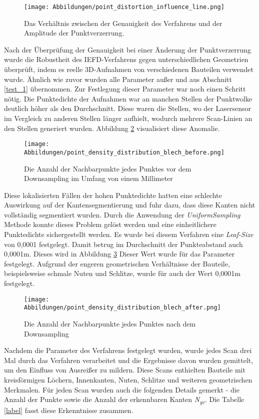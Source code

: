 \begin{figure}[h]
	\texttt{[image: Abbildungen/point\_distortion\_influence\_line.png]}
	\centering
	\caption{Das Verhältnis zwischen der Genauigkeit des Verfahrens und der Amplitude der Punktverzerrung.}
	\label{fig: point_distortion_comparision}
\end{figure}

Nach der Überprüfung der Genauigkeit bei einer Änderung der Punktverzerrung wurde die Robustheit des IEFD-Verfahrens gegen unterschiedlichen Geometrien überprüft, indem es reelle 3D-Aufnahmen von verschiedenen Bauteilen verwendet wurde. Ähnlich wie zuvor wurden alle Parameter außer \distthresha und \distthreshb aus Abschnitt \ref{test_1} übernommen. Zur Festlegung dieser Parameter war noch einen Schritt nötig. Die Punktedichte der Aufnahmen war an manchen Stellen der Punktwolke deutlich höher als den Durchschnitt. Diese waren die Stellen, wo der Lasersensor im Vergleich zu anderen Stellen länger aufhielt, wodurch mehrere Scan-Linien an den Stellen generiert wurden. Abbildung \ref{fig: point_density_before} visualisiert diese Anomalie. 

\begin{figure}[t]
\texttt{[image: Abbildungen/point\_density\_distribution\_blech\_before.png]}
\centering
\caption{Die Anzahl der Nachbarpunkte jedes Punktes vor dem Downsampling im Umfang von einem Millimeter}
\label{fig: point_density_before}
\end{figure}

Diese lokalisierten Fällen der hohen Punktedichte hatten eine schlechte Auswirkung auf der Kantensegmentierung und fuhr dazu, dass diese Kanten nicht vollständig segmentiert wurden. Durch die Anwendung der \textit{UniformSampling} Methode konnte dieses Problem gelöst werden und eine einheitlichere Punktedichte sichergestellt werden. Es wurde bei diesem Verfahren eine \textit{Leaf-Size} von 0,0001 festgelegt. Damit betrug im Durchschnitt der Punkteabstand auch 0,0001m. Dieses wird in Abbildung \ref{fig: point_density_after} Dieser Wert wurde für das Parameter \distthresha festgelegt. Aufgrund der engeren geometrischen Verhältnisse der Bauteile, beispielsweise schmale Nuten und Schlitze, wurde für \distthreshb auch der Wert 0,0001m festgelegt.

\begin{figure}[t]
	\texttt{[image: Abbildungen/point\_density\_distribution\_blech\_after.png]}
	\centering
	\caption{Die Anzahl der Nachbarpunkte jedes Punktes nach dem Downsampling}
	\label{fig: point_density_after}
\end{figure}

Nachdem die Parameter des Verfahrens festgelegt wurden, wurde jedes Scan drei Mal durch das Verfahren verarbeitet und die Ergebnisse davon wurden gemittelt, um den Einfluss von Ausreißer zu mildern. Diese Scans enthielten Bauteile mit kreisförmigen Löchern, Innenkanten, Nuten, Schlitze und weiteren geometrischen Merkmalen. Für jeden Scan wurden auch die folgenden Details gemerkt - die Anzahl der Punkte sowie die Anzahl der erkennbaren Kanten \textit{N\textsubscript{gc}}. Die Tabelle \ref{label} fasst diese Erkenntnisse zusammen.

